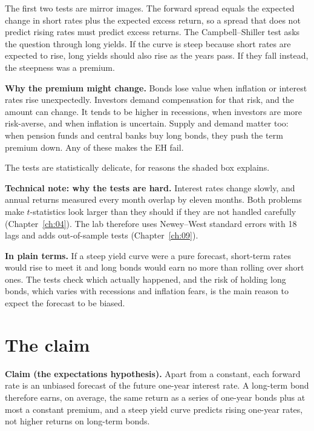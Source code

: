 The first two tests are mirror images. The forward spread equals the expected change in short rates plus the expected excess return, so a spread that does not predict rising rates must predict excess returns. The Campbell--Shiller test asks the question through long yields. If the curve is steep because short rates are expected to rise, long yields should also rise as the years pass. If they fall instead, the steepness was a premium.

\textbf{Why the premium might change.} Bonds lose value when inflation or interest rates rise unexpectedly. Investors demand compensation for that risk, and the amount can change. It tends to be higher in recessions, when investors are more risk-averse, and when inflation is uncertain. Supply and demand matter too: when pension funds and central banks buy long bonds, they push the term premium down. Any of these makes the EH fail.

The tests are statistically delicate, for reasons the shaded box explains.

\begin{technote}
\textbf{Technical note: why the tests are hard.} Interest rates change slowly, and annual returns measured every month overlap by eleven months. Both problems make $t$-statistics look larger than they should if they are not handled carefully (Chapter~\ref{ch:04}). The lab therefore uses Newey--West standard errors with 18 lags and adds out-of-sample tests (Chapter~\ref{ch:09}).
\end{technote}

\noindent\textbf{In plain terms.} If a steep yield curve were a pure forecast, short-term rates would rise to meet it and long bonds would earn no more than rolling over short ones. The tests check which actually happened, and the risk of holding long bonds, which varies with recessions and inflation fears, is the main reason to expect the forecast to be biased.

\section{The claim}
\label{sec:07-claim}

\begin{callout}
\textbf{Claim (the expectations hypothesis).} Apart from a constant, each forward rate is an unbiased forecast of the future one-year interest rate. A long-term bond therefore earns, on average, the same return as a series of one-year bonds plus at most a constant premium, and a steep yield curve predicts rising one-year rates, not higher returns on long-term bonds.
\end{callout}

